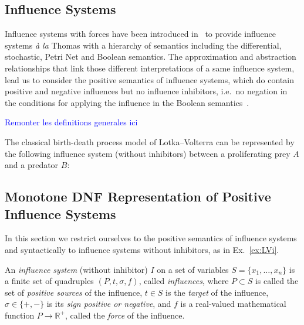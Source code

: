 \documentclass{llncs}
\newcommand{\francois}[1]{\textcolor{blue}{#1}}
\begin{document}
\subsection{Influence Systems}

Influence systems with forces have been introduced in~\cite{FMRS16cmsb}
to provide influence systems \emph{\`a la} Thomas with a hierarchy of semantics
including the differential, stochastic, Petri Net and Boolean semantics.
The approximation and abstraction relationships that link those different interpretations of a same influence system,
lead us to consider the positive semantics of influence systems,
which do contain positive and negative influences but no influence inhibitors, i.e.~no negation in the conditions
for applying the influence in the Boolean semantics~\cite{FMRS16cmsb}.

\francois{Remonter les definitions generales ici}

\begin{example}\label{ex:LVi}

  The classical birth-death process model of Lotka--Volterra can be
  represented by the following influence system (without inhibitors) between a
  proliferating prey $A$ and a predator $B$:

   

\end{example}


\subsection{Monotone DNF Representation of Positive Influence Systems}


In this section we restrict ourselves to the positive semantics of influence systems
and syntactically to influence systems without inhibitors, as in Ex.~\ref{ex:LVi}.


\begin{definition}
	
	An \emph{influence system} (without inhibitor) $I$ on a set of variables $S=\{x_1,\dots,x_n\}$ is a
	finite set of quadruples $(P, t, \sigma, f)$, called \emph{influences}, where
	$P\subset S$ is called the set of \emph{positive sources} of the influence,
	$t\in S$ is the \emph{target} of the influence,
	$\sigma\in\{+,-\}$ is its \emph{sign positive or negative}, and $f$ is a
	real-valued mathematical function $P\to\mathbb{R^+}$, called the
	\emph{force} of the influence.
	
\end{definition}
\end{document}

